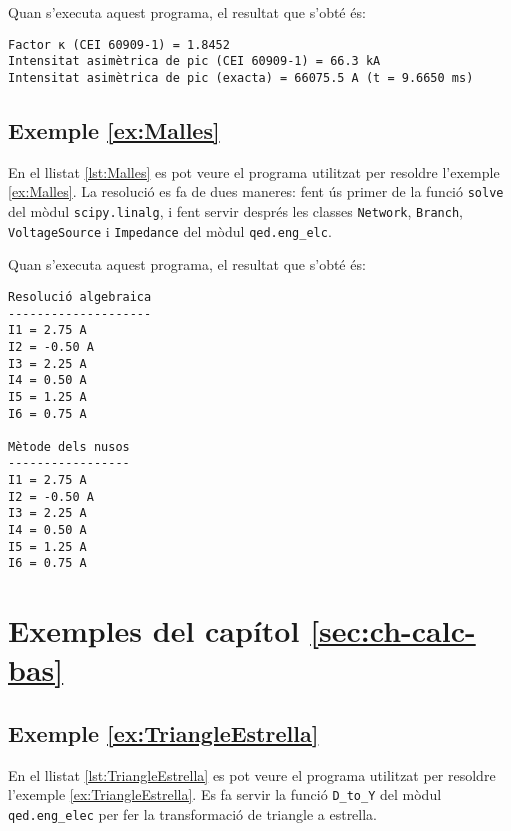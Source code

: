Quan s'executa aquest programa, el resultat que s'obté és:
\lstset{
	language=,
	numbers=none,
	frame=none
}
\begin{lstlisting}
Factor κ (CEI 60909-1) = 1.8452
Intensitat asimètrica de pic (CEI 60909-1) = 66.3 kA
Intensitat asimètrica de pic (exacta) = 66075.5 A (t = 9.6650 ms)
\end{lstlisting}


\hypertarget{exemple:Malles}{\subsection{Exemple \ref*{ex:Malles} \Malles}}
En el llistat \vref{lst:Malles} es pot veure el programa utilitzat per resoldre l'exemple \vref{ex:Malles}. La resolució es fa de dues maneres: fent ús  primer de la funció \texttt{solve} del mòdul \texttt{scipy.linalg}, i fent servir després les classes \texttt{Network}, \texttt{Branch}, \texttt{VoltageSource} i \texttt{Impedance} del mòdul \texttt{qed.eng\_elc}.


Quan s'executa aquest programa, el resultat que s'obté és:
\lstset{
	language=,
	numbers=none,
	frame=none
}
\begin{lstlisting}
Resolució algebraica
--------------------
I1 = 2.75 A
I2 = -0.50 A
I3 = 2.25 A
I4 = 0.50 A
I5 = 1.25 A
I6 = 0.75 A

Mètode dels nusos
-----------------
I1 = 2.75 A
I2 = -0.50 A
I3 = 2.25 A
I4 = 0.50 A
I5 = 1.25 A
I6 = 0.75 A
\end{lstlisting} 



\section{Exemples del capítol \ref*{sec:ch-calc-bas}}

\hypertarget{exemple:TriangleEstrella}{\subsection{Exemple \ref*{ex:TriangleEstrella} \TriangleEstrella}}
En el llistat \vref{lst:TriangleEstrella} es pot veure el programa utilitzat per resoldre l'exemple \vref{ex:TriangleEstrella}. Es fa servir la funció \texttt{D\_to\_Y} del mòdul \texttt{qed.eng\_elec} per fer la transformació de triangle a estrella.


